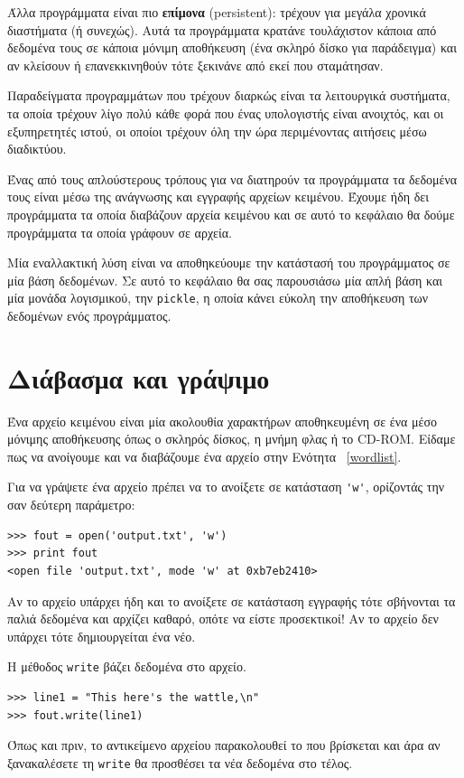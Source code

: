 \documentclass[10pt]{book}
\begin{document}
Άλλα προγράμματα είναι πιο {\bf επίμονα} (persistent): τρέχουν για μεγάλα χρονικά διαστήματα (ή συνεχώς). Αυτά τα προγράμματα κρατάνε τουλάχιστον κάποια από δεδομένα τους σε κάποια μόνιμη αποθήκευση (ένα σκληρό δίσκο για παράδειγμα) και αν κλείσουν ή επανεκκινηθούν τότε ξεκινάνε από εκεί που σταμάτησαν.

Παραδείγματα προγραμμάτων που τρέχουν διαρκώς είναι τα λειτουργικά συστήματα, τα οποία τρέχουν λίγο 
πολύ κάθε φορά που ένας υπολογιστής είναι ανοιχτός, και οι εξυπηρετητές ιστού, οι οποίοι 
τρέχουν όλη την ώρα περιμένοντας αιτήσεις μέσω διαδικτύου.

Ένας από τους απλούστερους τρόπους για να διατηρούν τα προγράμματα τα δεδομένα τους είναι μέσω της ανάγνωσης και εγγραφής αρχείων κειμένου. Έχουμε ήδη δει προγράμματα τα οποία διαβάζουν αρχεία κειμένου και σε αυτό το κεφάλαιο θα δούμε προγράμματα τα οποία γράφουν σε αρχεία.

Μία εναλλακτική λύση είναι να αποθηκεύουμε την κατάστασή του προγράμματος σε μία βάση 
δεδομένων. Σε αυτό το κεφάλαιο θα σας παρουσιάσω μία απλή βάση και μία μονάδα λογισμικού, την  {\tt pickle},  η οποία κάνει εύκολη την αποθήκευση των δεδομένων ενός  προγράμματος.


\section{Διάβασμα και γράψιμο}

Ένα αρχείο κειμένου είναι μία ακολουθία χαρακτήρων αποθηκευμένη σε ένα μέσο μόνιμης αποθήκευσης όπως ο σκληρός δίσκος, η μνήμη φλας ή το  CD-ROM.  Είδαμε πως να ανοίγουμε και να διαβάζουμε ένα αρχείο στην Ενότητα ~\ref{wordlist}.

Για να γράψετε ένα αρχείο πρέπει να το ανοίξετε σε κατάσταση \verb"'w'", ορίζοντάς την σαν δεύτερη παράμετρο:

\begin{verbatim}
>>> fout = open('output.txt', 'w')
>>> print fout
<open file 'output.txt', mode 'w' at 0xb7eb2410>
\end{verbatim}
%
Αν το αρχείο υπάρχει ήδη και το ανοίξετε σε κατάσταση εγγραφής τότε σβήνονται τα 
παλιά δεδομένα και αρχίζει καθαρό, οπότε να είστε προσεκτικοί! Αν το αρχείο 
δεν υπάρχει τότε δημιουργείται ένα νέο.

Η μέθοδος {\tt write} βάζει δεδομένα στο αρχείο.  

\begin{verbatim}
>>> line1 = "This here's the wattle,\n"
>>> fout.write(line1)
\end{verbatim}
%
Όπως και πριν, το αντικείμενο αρχείου παρακολουθεί το που βρίσκεται και άρα αν ξανακαλέσετε 
τη {\tt write} θα προσθέσει τα νέα δεδομένα στο τέλος. 
\end{document}
